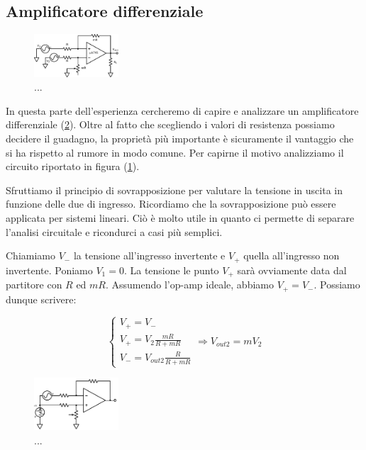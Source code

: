 \subsection{Amplificatore differenziale}

\begin{figure}
  \begin{center}
    \includegraphics[width=0.280\textwidth]{../E05/latex/c_teo_diff_amp.pdf}
  \end{center}
  \caption{...}
  \label{cir5:diff_amp_teo}
\end{figure}

In questa parte dell'esperienza cercheremo di capire e analizzare un amplificatore differenziale (\ref{cir5:diff_amp}). Oltre al fatto che scegliendo i valori di resistenza possiamo decidere il guadagno, la proprietà più importante è sicuramente il vantaggio che si ha rispetto al rumore in modo comune. Per capirne il motivo analizziamo il circuito riportato in figura (\ref{cir5:diff_amp_teo}).

Sfruttiamo il principio di sovrapposizione per valutare la tensione in uscita in funzione delle due di ingresso. Ricordiamo che la sovrapposizione può essere applicata per sistemi lineari. Ciò è molto utile in quanto ci permette di separare l'analisi circuitale e ricondurci a casi più semplici.

Chiamiamo $V_-$ la tensione all'ingresso invertente e $V_+$ quella all'ingresso non invertente. Poniamo $V_1=0$. La tensione le punto $V_+$ sarà ovviamente data dal partitore con $R$ ed $mR$. Assumendo l'op-amp ideale, abbiamo $V_+=V_-$. Possiamo dunque scrivere:

\begin{equation}
\begin{cases} V_+=V_-  \\ V_+=V_2\frac{mR}{R+mR} \\ V_-= V_{out2}\frac{R}{R+mR}\end{cases}  \Rightarrow V_{out2}=mV_2
\label{eq 5: vout2}
\end{equation}

\begin{figure}
  \begin{center}
    \includegraphics[width=0.280\textwidth]{../E05/latex/c_diff_amp.pdf}
  \end{center}
  \caption{...}
  \label{cir5:diff_amp}
\end{figure}

